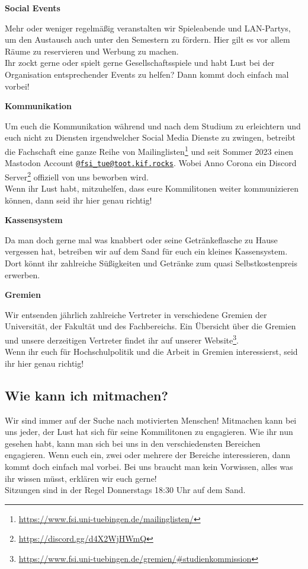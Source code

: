 \vfill \pagebreak
\textbf{Social Events}

Mehr oder weniger regelmäßig veranstalten wir Spieleabende und LAN-Partys, um
den Austausch auch unter den Semestern zu fördern. Hier gilt es vor allem Räume
zu reservieren und Werbung zu machen. \\
Ihr zockt gerne oder spielt gerne Gesellschaftsspiele und habt Lust bei der
Organisation entsprechender Events zu helfen? Dann kommt doch einfach mal
vorbei!

\textbf{Kommunikation}

Um euch die Kommunikation während und nach dem Studium zu erleichtern und euch
nicht zu Diensten irgendwelcher Social Media Dienste zu zwingen, betreibt die
Fachschaft eine ganze Reihe von
Mailinglisten\footnote{\url{https://www.fsi.uni-tuebingen.de/mailinglisten/}} und
seit Sommer 2023 einen Mastodon Account
\href{https://toot.kif.rocks/@fsi\_tue}{\texttt{@fsi\_tue@toot.kif.rocks}}.
Wobei Anno Corona ein Discord Server\footnote{\url{https://discord.gg/d4X2WjHWmQ}}
offiziell von uns beworben wird. \\
Wenn ihr Lust habt, mitzuhelfen, dass eure Kommilitonen weiter kommunizieren
können, dann seid ihr hier genau richtig!

\textbf{Kassensystem}

Da man doch gerne mal was knabbert oder seine Getränkeflasche zu Hause
vergessen hat, betreiben wir auf dem Sand für euch ein kleines Kassensystem.
Dort könnt ihr zahlreiche Süßigkeiten und Getränke zum quasi Selbstkostenpreis
erwerben. 

\textbf{Gremien}

Wir entsenden jährlich zahlreiche Vertreter in verschiedene Gremien der
Universität, der Fakultät und des Fachbereichs. Ein Übersicht über die Gremien
und unsere derzeitigen Vertreter findet ihr auf unserer
Website\footnote{\url{https://www.fsi.uni-tuebingen.de/gremien/\#studienkommission}}.
\\
Wenn ihr euch für Hochschulpolitik und die Arbeit in Gremien interessierst,
seid ihr hier genau richtig!

%
\subsection{Wie kann ich mitmachen?}
Wir sind immer auf der Suche nach motivierten Menschen! Mitmachen kann bei uns
jeder, der Lust hat sich für seine Kommilitonen zu engagieren. Wie ihr nun
gesehen habt, kann man sich bei uns in den verschiedensten Bereichen
engagieren. Wenn euch ein, zwei oder mehrere der Bereiche interessieren, dann
kommt doch einfach mal vorbei. Bei uns braucht man kein Vorwissen, alles was
ihr wissen müsst, erklären wir euch gerne!\\
Sitzungen sind in der Regel Donnerstags 18:30 Uhr auf dem Sand.


